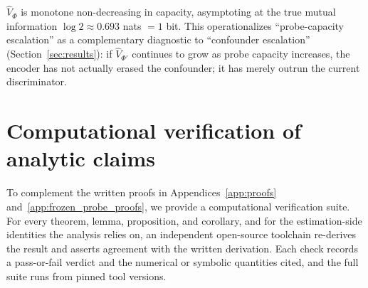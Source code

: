 \documentclass{article}
\begin{document}
$\hat V_\Phi$ is monotone non-decreasing in capacity, asymptoting at the true mutual information $\log 2 \approx 0.693$ nats $= 1$ bit. This operationalizes ``probe-capacity escalation'' as a complementary diagnostic to ``confounder escalation'' (Section~\ref{sec:results}): if $\hat V_{\Phi'}$ continues to grow as probe capacity increases, the encoder has not actually erased the confounder; it has merely outrun the current discriminator.

\section{Computational verification of analytic claims}
\label{app:verification}

To complement the written proofs in Appendices~\ref{app:proofs} and~\ref{app:frozen_probe_proofs}, we provide a computational verification suite. For every theorem, lemma, proposition, and corollary, and for the estimation-side identities the analysis relies on, an independent open-source toolchain re-derives the result and asserts agreement with the written derivation. Each check records a pass-or-fail verdict and the numerical or symbolic quantities cited, and the full suite runs from pinned tool versions.
\end{document}

